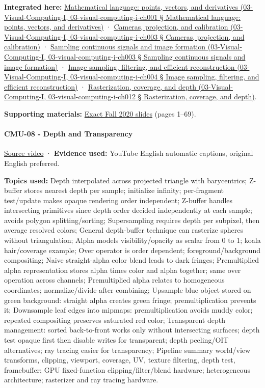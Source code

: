 \textbf{Integrated here:} \href{}{Mathematical language: points, vectors, and derivatives (03-Visual-Computing-I, 03-visual-computing-i-ch001 § Mathematical language: points, vectors, and derivatives)} · \href{}{Cameras, projection, and calibration (03-Visual-Computing-I, 03-visual-computing-i-ch003 § Cameras, projection, and calibration)} · \href{}{Sampling continuous signals and image formation (03-Visual-Computing-I, 03-visual-computing-i-ch003 § Sampling continuous signals and image formation)} · \href{}{Image sampling, filtering, and efficient reconstruction (03-Visual-Computing-I, 03-visual-computing-i-ch004 § Image sampling, filtering, and efficient reconstruction)} · \href{}{Rasterization, coverage, and depth (03-Visual-Computing-I, 03-visual-computing-i-ch012 § Rasterization, coverage, and depth)}.

\textbf{Supporting materials:} \href{https://15462.courses.cs.cmu.edu/fall2020content/lectures/07_texture/07_texture_slides.pdf}{Exact Fall 2020 slides} (pages 1--69).

\paragraph{CMU-08 - Depth and Transparency}\label{cmu-08---depth-and-transparency}

\href{https://www.youtube.com/watch?v=WtYfF48Z9mA}{Source video} · \textbf{Evidence used:} YouTube English automatic captions, original English preferred.

\textbf{Topics used:} Depth interpolated across projected triangle with barycentrics; Z-buffer stores nearest depth per sample; initialize infinity; per-fragment test/update makes opaque rendering order independent; Z-buffer handles intersecting primitives since depth order decided independently at each sample; avoids polygon splitting/sorting; Supersampling requires depth per subpixel, then average resolved colors; General depth-buffer technique can rasterize spheres without triangulation; Alpha models visibility/opacity as scalar from 0 to 1; koala hair/coverage example; Over operator is order dependent; foreground/background compositing; Naive straight-alpha color blend leads to dark fringes; Premultiplied alpha representation stores alpha times color and alpha together; same over operation across channels; Premultiplied alpha relates to homogeneous coordinates; normalize/divide after combining; Upsample blue object stored on green background: straight alpha creates green fringe; premultiplication prevents it; Downsample leaf edges into mipmaps: premultiplication avoids muddy color; repeated compositing preserves saturated red color; Transparent depth management: sorted back-to-front works only without intersecting surfaces; depth test opaque first then disable writes for transparent; depth peeling/OIT alternatives; ray tracing easier for transparency; Pipeline summary world/view transforms, clipping, viewport, coverage, UV, texture filtering, depth test, framebuffer; GPU fixed-function clipping/filter/blend hardware; heterogeneous architecture; rasterizer and ray tracing hardware.

